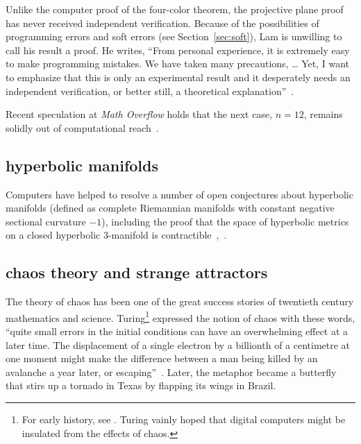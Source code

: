\documentclass{llncs}
\begin{document}
Unlike the computer proof of the four-color theorem, the
projective plane proof has never received independent verification.
Because of the possibilities of programming errors and soft errors
(see Section~\ref{sec:soft}), Lam is unwilling to call his result a
proof.  He writes, ``From personal experience, it is extremely easy to
make programming mistakes. We have taken many precautions, 
\dots
Yet, I want to emphasize that this is only an
experimental result and it desperately needs an independent
verification, or better still, a theoretical
explanation''~\cite{LamS}.


Recent speculation at {\it Math Overflow} holds that the next case,
$n=12$, remains solidly out of computational reach~\cite{Horn}.



\subsection{hyperbolic manifolds}

Computers have helped to resolve a number of open conjectures about
hyperbolic manifolds (defined as complete Riemannian manifolds with
constant negative sectional curvature $-1$), including the proof that
the space of hyperbolic metrics on a closed hyperbolic $3$-manifold is
contractible~\cite{GMT},~\cite{GabICM}.


\subsection{chaos theory and strange attractors}

The theory of chaos has been one of the great success stories of
twentieth century mathematics and science.   Turing\footnote{For
  early history, see \cite[p.~971]{Wolfram:NKS}. Turing vainly hoped that
  digital computers might be insulated from the effects of chaos.}
expressed the notion of chaos with these words, ``quite small errors
in the initial conditions can have an overwhelming effect at a later
time.  The displacement of a single electron by a billionth of a
centimetre at one moment might make the difference between a man being
killed by an avalanche a year later, or escaping''~\cite{Tu50}.
Later, the metaphor became a butterfly
that stirs up a tornado in Texas by flapping its wings in Brazil.
\end{document}
